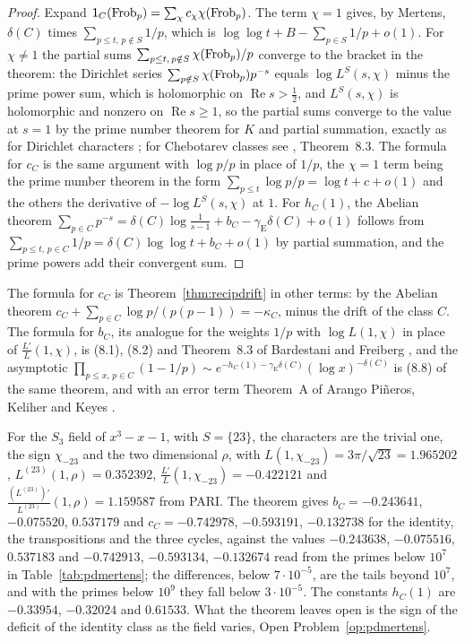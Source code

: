 \begin{proof}
Expand $\mathsf1_C(\operatorname{Frob}_p)=\sum_\chi c_\chi\chi(\operatorname{Frob}_p)$. The term $\chi=1$ gives, by Mertens, $\delta(C)$ times $\sum_{p\le t,\,p\notin S}1/p$, which is $\log\log t+B-\sum_{p\in S}1/p+o(1)$. For $\chi\ne1$ the partial sums $\sum_{p\le t,\,p\notin S}\chi(\operatorname{Frob}_p)/p$ converge to the bracket in the theorem: the Dirichlet series $\sum_{p\notin S}\chi(\operatorname{Frob}_p)p^{-s}$ equals $\log L^S(s,\chi)$ minus the prime power sum, which is holomorphic on $\operatorname{Re}s>\frac12$, and $L^S(s,\chi)$ is holomorphic and nonzero on $\operatorname{Re}s\ge1$, so the partial sums converge to the value at $s=1$ by the prime number theorem for $K$ and partial summation, exactly as for Dirichlet characters \cite{tenenbaum2015}; for Chebotarev classes see \cite{bardestanifreiberg2013}, Theorem~8.3. The formula for $c_C$ is the same argument with $\log p/p$ in place of $1/p$, the $\chi=1$ term being the prime number theorem in the form $\sum_{p\le t}\log p/p=\log t+c+o(1)$ and the others the derivative of $-\log L^S(s,\chi)$ at $1$. For $h_C(1)$, the Abelian theorem $\sum_{p\in C}p^{-s}=\delta(C)\log\frac1{s-1}+b_C-\gamma_{\mathrm E}\delta(C)+o(1)$ follows from $\sum_{p\le t,\,p\in C}1/p=\delta(C)\log\log t+b_C+o(1)$ by partial summation, and the prime powers add their convergent sum.
\end{proof}

The formula for $c_C$ is Theorem~\ref{thm:recipdrift} in other terms: by the Abelian theorem $c_C+\sum_{p\in C}\log p/(p(p-1))=-\kappa_C$, minus the drift of the class $C$. The formula for $b_C$, its analogue for the weights $1/p$ with $\log L(1,\chi)$ in place of $\frac{L'}L(1,\chi)$, is (8.1), (8.2) and Theorem~8.3 of Bardestani and Freiberg \cite{bardestanifreiberg2013}, and the asymptotic $\prod_{p\le x,\,p\in C}(1-1/p)\sim e^{-h_C(1)-\gamma_{\mathrm E}\delta(C)}(\log x)^{-\delta(C)}$ is (8.8) of the same theorem, and with an error term Theorem~A of Arango Pi\~neros, Keliher and Keyes \cite{arangopinerokeliherkeyes2022}.

For the $S_3$ field of $x^3-x-1$, with $S=\{23\}$, the characters are the trivial one, the sign $\chi_{-23}$ and the two dimensional $\rho$, with $L(1,\chi_{-23})=3\pi/\sqrt{23}=1.965202$, $L^{(23)}(1,\rho)=0.352392$, $\frac{L'}L(1,\chi_{-23})=-0.422121$ and $\frac{(L^{(23)})'}{L^{(23)}}(1,\rho)=1.159587$ from PARI. The theorem gives $b_C=-0.243641$, $-0.075520$, $0.537179$ and $c_C=-0.742978$, $-0.593191$, $-0.132738$ for the identity, the transpositions and the three cycles, against the values $-0.243638$, $-0.075516$, $0.537183$ and $-0.742913$, $-0.593134$, $-0.132674$ read from the primes below $10^7$ in Table~\ref{tab:pdmertens}; the differences, below $7\cdot10^{-5}$, are the tails beyond $10^7$, and with the primes below $10^9$ they fall below $3\cdot10^{-5}$. The constants $h_C(1)$ are $-0.33954$, $-0.32024$ and $0.61533$. What the theorem leaves open is the sign of the deficit of the identity class as the field varies, Open Problem~\ref{op:pdmertens}.

